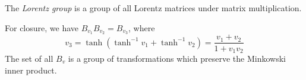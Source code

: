 \documentclass[a4paper]{article}
\begin{document}
\begin{defi}
  The \emph{Lorentz group} is a group of all Lorentz matrices under matrix multiplication.
\end{defi}
\note For closure, we have $B_{v_1}B_{v_2} = B_{v_3}$, where
\[
v_3 = \tanh(\tanh^{-1} v_1 + \tanh^{-1} v_2) = \frac{v_1 + v_2}{1 + v_1v_2}
\]
The set of all $B_v$ is a group of transformations which preserve the Minkowski inner product.
\end{document}
